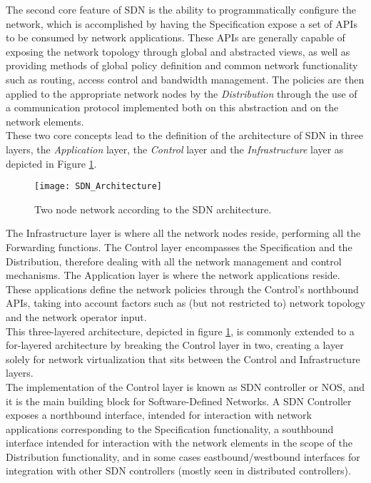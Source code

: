 %
The second core feature of \gls{SDN} is the ability to programmatically configure the network, which is accomplished by having the Specification expose a set of \glspl{API} to be consumed by network applications.
These \glspl{API} are generally capable of exposing the network topology through global and abstracted views, as well as providing methods of global policy definition and common network functionality such as routing, access control and bandwidth management\cite{OFWP}.
The policies are then applied to the appropriate network nodes by the \emph{Distribution} through the use of a communication protocol implemented both on this abstraction and on the network elements.\\
%
These two core concepts lead to the definition of the architecture of \gls{SDN} in three layers, the \emph{Application} layer, the \emph{Control} layer and the \emph{Infrastructure} layer \cite{OpenNetworkingFoundation,Kreutz2014} as depicted in Figure \ref{fig:SDN_Architecture}.
\begin{figure}
	\centering
	\texttt{[image: SDN\_Architecture]}
	\caption{Two node network according to the SDN architecture.}
	\label{fig:SDN_Architecture}
\end{figure}
The Infrastructure layer is where all the network nodes reside, performing all the Forwarding functions.
The Control layer encompasses the Specification and the Distribution, therefore dealing with all the network management and control mechanisms.
The Application layer is where the network applications reside.
These applications define the network policies through the Control's northbound \glspl{API}, taking into account factors such as (but not restricted to) network topology and the network operator input.\\
This three-layered architecture, depicted in figure \ref{fig:SDN_Architecture}, is commonly extended to a for-layered architecture by breaking the Control layer in two, creating a layer solely for network virtualization that sits between the Control and Infrastructure layers.\\
%
The implementation of the Control layer is known as \gls{SDN} controller or \gls{NOS}, and it is the main building block for Software-Defined Networks.
A \gls{SDN} Controller exposes a northbound interface, intended for interaction with network applications corresponding to the Specification functionality, a southbound interface intended for interaction with the network elements in the scope of the Distribution functionality, and in some cases eastbound/westbound interfaces for integration with other \gls{SDN} controllers (mostly seen in distributed controllers)\cite{Kreutz2014}.

